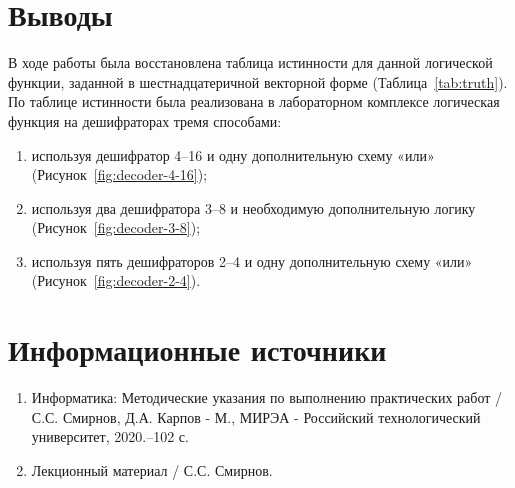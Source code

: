 \documentclass[a4paper]{article}
\begin{document}
    \section{Выводы}\label{sec:conclusion}
    В ходе работы была восстановлена таблица истинности для данной логической функции,
    заданной в шестнадцатеричной векторной форме (Таблица~\ref{tab:truth}).
    По таблице истинности была реализована в лабораторном комплексе логическая функция
    на дешифраторах тремя способами:
    \begin{enumerate}
        \item используя дешифратор 4--16 и одну дополнительную схему «или» (Рисунок~\ref{fig:decoder-4-16});
        \item используя два дешифратора 3--8 и необходимую дополнительную логику (Рисунок~\ref{fig:decoder-3-8});
        \item используя пять дешифраторов 2--4 и одну дополнительную схему «или» (Рисунок~\ref{fig:decoder-2-4}).
    \end{enumerate}


    \section{Информационные источники}\label{sec:sources}
    \begin{enumerate}
        \item Информатика: Методические указания по выполнению практических
        работ / С.С. Смирнов, Д.А. Карпов - М., МИРЭА - Российский технологический университет, 2020.–102 с.
        \item Лекционный материал / С.С. Смирнов.
    \end{enumerate}
\end{document}
